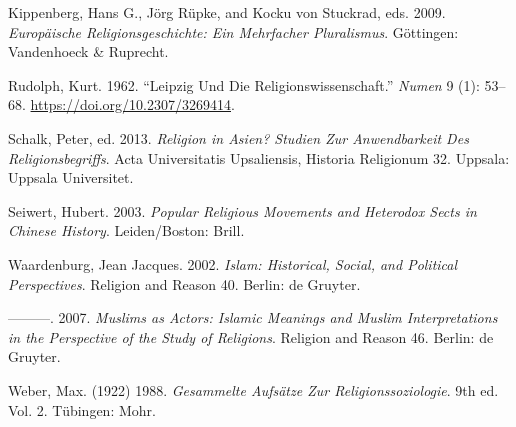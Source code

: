 \documentclass[
  english,
  a4paper,
  DIV=12,
  footlines=2.1,
  usegeometry=true]{scrartcl}
\newlength{\cslhangindent}
\newenvironment{cslreferences}%
  {\setlength{\parindent}{0pt}%
  \everypar{\setlength{\hangindent}{\cslhangindent}}\ignorespaces}%
  {\par}
\begin{document}
\begin{cslreferences}
\leavevmode\hypertarget{ref-kippenberg_europaische_2009}{}%
Kippenberg, Hans G., Jörg Rüpke, and Kocku von Stuckrad, eds. 2009.
\emph{Europäische Religionsgeschichte: Ein Mehrfacher Pluralismus}.
Göttingen: Vandenhoeck \& Ruprecht.

\leavevmode\hypertarget{ref-rudolph_leipzig_1962}{}%
Rudolph, Kurt. 1962. ``Leipzig Und Die Religionswissenschaft.''
\emph{Numen} 9 (1): 53--68. \url{https://doi.org/10.2307/3269414}.

\leavevmode\hypertarget{ref-schalk_religion_2013}{}%
Schalk, Peter, ed. 2013. \emph{Religion in Asien? Studien Zur
Anwendbarkeit Des Religionsbegriffs}. Acta Universitatis Upsaliensis,
Historia Religionum 32. Uppsala: Uppsala Universitet.

\leavevmode\hypertarget{ref-seiwert_popular_2003}{}%
Seiwert, Hubert. 2003. \emph{Popular Religious Movements and Heterodox
Sects in Chinese History}. Leiden/Boston: Brill.

\leavevmode\hypertarget{ref-waardenburg_islam:_2002}{}%
Waardenburg, Jean Jacques. 2002. \emph{Islam: Historical, Social, and
Political Perspectives}. Religion and Reason 40. Berlin: de Gruyter.

\leavevmode\hypertarget{ref-waardenburg_muslims_2007}{}%
---------. 2007. \emph{Muslims as Actors: Islamic Meanings and Muslim
Interpretations in the Perspective of the Study of Religions}. Religion
and Reason 46. Berlin: de Gruyter.

\leavevmode\hypertarget{ref-weber_gesammelte_1988}{}%
Weber, Max. (1922) 1988. \emph{Gesammelte Aufsätze Zur
Religionssoziologie}. 9th ed. Vol. 2. Tübingen: Mohr.
\end{cslreferences}
\end{document}
